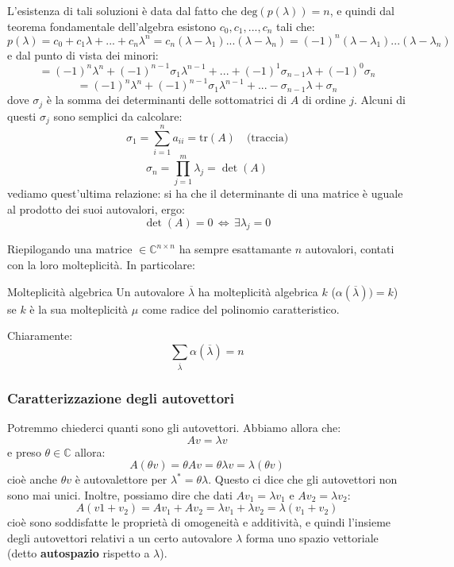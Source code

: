 \documentclass[a4paper,11pt]{article}
\begin{document}
L'esistenza di tali soluzioni è data dal fatto che $\mathrm{deg}\left(p(\lambda)\right) = n$, e quindi dal teorema fondamentale dell'algebra esistono $c_0, c_1, ..., c_n$ tali che:
$$
p(\lambda) = c_0 + c_1 \lambda + ... + c_n \lambda^n = c_n (\lambda - \lambda_1) ... (\lambda - \lambda_n) = (-1)^n (\lambda - \lambda_1) ... (\lambda - \lambda_n)
$$
e dal punto di vista dei minori:
$$
= (-1)^n \lambda^n + (-1)^{n - 1} \sigma_1 \lambda^{n - 1} + ... + (-1)^1 \sigma_{n - 1} \lambda + (-1)^0 \sigma_{n}
$$
$$
= (-1)^n \lambda^n + (-1)^{n - 1} \sigma_1 \lambda^{n - 1} + ... - \sigma_{n - 1} \lambda + \sigma_{n}
$$
dove $\sigma_j$ è la somma dei determinanti delle sottomatrici di $A$ di ordine $j$.
Alcuni di questi $\sigma_j$ sono semplici da calcolare:
$$
\sigma_1 = \sum_{i = 1}^n a_{ii} = \mathrm{tr}(A) \quad \text{(traccia)}
$$
$$
\sigma_n = \prod_{j=1}^m \lambda_j = \det(A)
$$
vediamo quest'ultima relazione: si ha che il determinante di una matrice è uguale al prodotto dei suoi autovalori, ergo:
$$
\det(A) = 0 \, \Leftrightarrow \, \exists \lambda_j = 0
$$

\par\smallskip

Riepilogando una matrice $\in \mathbb{C}^{n \times n}$ ha sempre esattamante $n$ autovalori, contati con la loro molteplicità.
In particolare:
\begin{definition}{Molteplicità algebrica}
	Un autovalore $\overline{\lambda}$ ha molteplicità algebrica $k$ ($\alpha(\overline{\lambda})) = k$) se $k$ è la sua molteplicità $\mu$ come radice del polinomio caratteristico.
\end{definition}

Chiaramente:
$$
\sum_{\overline{\lambda}} \alpha(\overline{\lambda}) = n
$$

\subsubsection{Caratterizzazione degli autovettori}
Potremmo chiederci quanti sono gli autovettori.
Abbiamo allora che:
$$
A v = \lambda v
$$
e preso $\theta \in \mathbb{C}$ allora:
$$
A(\theta v) = \theta A v
 = \theta \lambda v = \lambda (\theta v)
 $$
cioè anche $\theta v$ è autovalettore per $\lambda^* = \theta \lambda$.
Questo ci dice che gli autovettori non sono mai unici.
Inoltre, possiamo dire che dati $A v_1 = \lambda v_1$ e $A v_2 = \lambda v_2$:
$$
A(v1 + v_2) = A v_1 + A v_2 = \lambda v_1 + \lambda v_2 = \lambda (v_1 + v_2)
$$
cioè sono soddisfatte le proprietà di omogeneità e additività, e quindi l'insieme degli autovettori relativi a un certo autovalore $\lambda$ forma uno spazio vettoriale (detto \textbf{autospazio} rispetto a $\lambda$).
\end{document}
